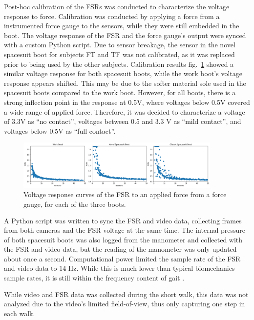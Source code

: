 \documentclass[defaultstyle,11pt]{comps}
\begin{document}
Post-hoc calibration of the FSRs was conducted to characterize the voltage response to force.
Calibration was conducted by applying a force from a instrumented force gauge to the sensors, while they were still embedded in the boot.
The voltage response of the FSR and the force gauge's output were synced with a custom Python script.
Due to sensor breakage, the sensor in the novel spacesuit boot for subjects FT and TF was not calibrated, as it was replaced prior to being used by the other subjects.
Calibration results fig.~\ref{fig:SA4-FSRcal} showed a similar voltage response for both spacesuit boots, while the work boot's voltage response appears shifted.
This may be due to the softer material sole used in the spacesuit boots compared to the work boot.
However, for all boots, there is a strong inflection point in the response at 0.5V, where voltages below 0.5V covered a wide range of applied force.
Therefore, it was decided to characterize a voltage of 3.3V as ``no contact'', voltages between 0.5 and 3.3 V as ``mild contact'', and voltages below 0.5V as ``full contact''.

\begin{figure}
\hypertarget{fig:SA4-FSRcal}{%
\centering
\includegraphics[width=0.9\textwidth,height=\textheight]{../fig/SA4/FSR_cal.png}
\caption{Voltage response curves of the FSR to an applied force from a force gauge, for each of the three boots.}\label{fig:SA4-FSRcal}
}
\end{figure}

A Python script was written to sync the FSR and video data, collecting frames from both cameras and the FSR voltage at the same time.
The internal pressure of both spacesuit boots was also logged from the manometer and collected with the FSR and video data, but the reading of the manometer was only updated about once a second.
Computational power limited the sample rate of the FSR and video data to 14 Hz.
While this is much lower than typical biomechanics sample rates, it is still within the frequency content of gait \citep{Antonsson1985}.

While video and FSR data was collected during the short walk, this data was not analyzed due to the video's limited field-of-view, thus only capturing one step in each walk.
\end{document}
